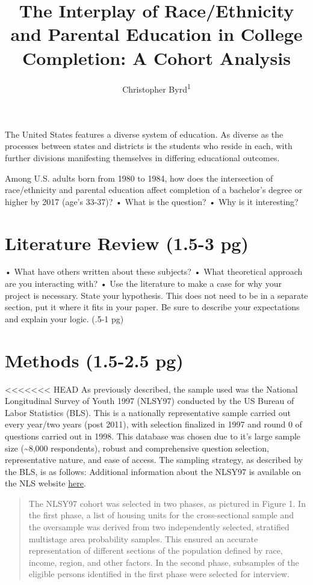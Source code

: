 \documentclass[
  man]{apa6}
\title{The Interplay of Race/Ethnicity and Parental Education in College Completion: A Cohort Analysis}
\author{Christopher Byrd\textsuperscript{1}}
\date{}
\affiliation{\vspace{0.5cm}\textsuperscript{1} Whitworth University}
\begin{document}
\maketitle

The United States features a diverse system of education. As diverse as the processes between states and districts is the students who reside in each, with further divisions manifesting themselves in differing educational outcomes.

Among U.S. adults born from 1980 to 1984, how does the intersection of race/ethnicity and parental education affect completion of a bachelor's degree or higher by 2017 (age's 33-37)? • What is the question? • Why is it interesting?

\section{Literature Review (1.5-3 pg)}\label{literature-review-1.5-3-pg}

• What have others written about these subjects? • What theoretical approach are you interacting with? • Use the literature to make a case for why your project is necessary. State your hypothesis. This does not need to be in a separate section, put it where it fits in your paper. Be sure to describe your expectations and explain your logic. (.5-1 pg)

\section{Methods (1.5-2.5 pg)}\label{methods-1.5-2.5-pg}

<<<<<<< HEAD
As previously described, the sample used was the National Longitudinal Survey of Youth 1997 (NLSY97) conducted by the US Bureau of Labor Statistics (BLS). This is a nationally representative sample carried out every year/two years (post 2011), with selection finalized in 1997 and round 0 of questions carried out in 1998. This database was chosen due to it's large sample size (\textasciitilde8,000 respondents), robust and comprehensive question selection, representative nature, and ease of access. The sampling strategy, as described by the BLS, is as follows: Additional information about the NLSY97 is available on the NLS website \href{https://www.nlsinfo.org/content/cohorts/nlsy97}{here}.

\begin{quote}
The NLSY97 cohort was selected in two phases, as pictured in Figure 1. In the first phase, a list of housing units for the cross-sectional sample and the oversample was derived from two independently selected, stratified multistage area probability samples. This ensured an accurate representation of different sections of the population defined by race, income, region, and other factors. In the second phase, subsamples of the eligible persons identified in the first phase were selected for interview.
\end{quote}
\end{document}
